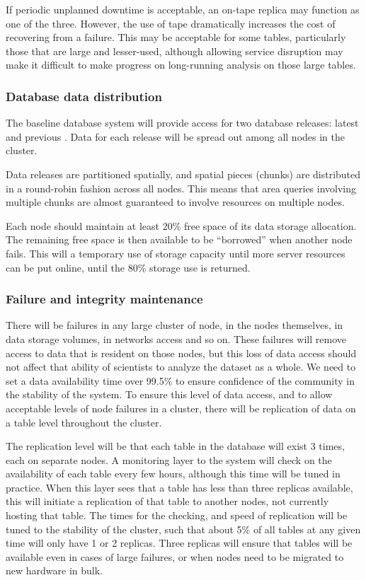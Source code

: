 \documentclass[DM,lsstdraft,toc]{lsstdoc}
\begin{document}
If periodic unplanned downtime is acceptable, an on-tape replica may
function as one of the three. However, the use of tape dramatically
increases the cost of recovering from a failure. This may be acceptable
for some tables, particularly those that are large and lesser-used,
although allowing service disruption may make it difficult to make
progress on long-running analysis on those large tables.

\subsubsection{Database data
distribution}\label{database-data-distribution}

The baseline database system will provide access for two database
releases: latest and previous . Data for each release will be spread out
among all nodes in the cluster.

Data releases are partitioned spatially, and spatial pieces (chunks) are
distributed in a round-robin fashion across all nodes. This means that
area queries involving multiple chunks are almost guaranteed to involve
resources on multiple nodes.

Each node should maintain at least 20\% free space of its data storage
allocation. The remaining free space is then available to be
``borrowed'' when another node fails. This will a temporary use of
storage capacity until more server resources can be put online, until
the 80\% storage use is returned.

\subsubsection{Failure and integrity
maintenance}\label{failure-and-integrity-maintenance}

There will be failures in any large cluster of node, in the nodes
themselves, in data storage volumes, in networks access and so on. These
failures will remove access to data that is resident on those nodes, but
this loss of data access should not affect that ability of scientists to
analyze the dataset as a whole. We need to set a data availability time
over 99.5\% to ensure confidence of the community in the stability of
the system. To ensure this level of data access, and to allow acceptable
levels of node failures in a cluster, there will be replication of data
on a table level throughout the cluster.

The replication level will be that each table in the database will exist
3 times, each on separate nodes. A monitoring layer to the system will
check on the availability of each table every few hours, although this
time will be tuned in practice. When this layer sees that a table has
less than three replicas available, this will initiate a replication of
that table to another nodes, not currently hosting that table. The times
for the checking, and speed of replication will be tuned to the
stability of the cluster, such that about 5\% of all tables at any given
time will only have 1 or 2 replicas. Three replicas will ensure that
tables will be available even in cases of large failures, or when nodes
need to be migrated to new hardware in bulk.
\end{document}
